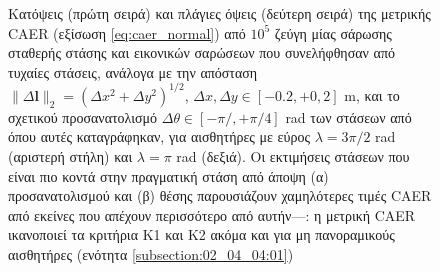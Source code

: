 \begin{figure}\centering
  
  \vspace{1cm}
  \caption{\small Κατόψεις (πρώτη σειρά) και πλάγιες όψεις
           (δεύτερη σειρά) της μετρικής CAER (εξίσωση \ref{eq:caer_normal}) από
           $10^5$ ζεύγη μίας σάρωσης σταθερής στάσης και εικονικών σαρώσεων που
           συνελήφθησαν από τυχαίες στάσεις, ανάλογα με την απόσταση $\|\Delta
           \bm{l}\|_2 = (\Delta x^2 + \Delta y^2)^{1/2}$, $\Delta x, \Delta y
           \in [-0.2, +0,2]$ m, και το σχετικού προσανατολισμό $\Delta \theta
           \in [-\pi/, +\pi/4]$ rad των στάσεων από όπου αυτές καταγράφηκαν,
           για αισθητήρες με εύρος $\lambda = 3\pi/2$ rad (αριστερή στήλη) και
           $\lambda = \pi$ rad (δεξιά). Οι εκτιμήσεις στάσεων που είναι πιο
           κοντά στην πραγματική στάση από άποψη (α) προσανατολισμού και (β)
           θέσης παρουσιάζουν χαμηλότερες τιμές CAER από εκείνες που απέχουν
           περισσότερο από αυτήν---: η μετρική CAER ικανοποιεί τα κριτήρια Κ1
           και Κ2 ακόμα και για μη πανοραμικούς
           αισθητήρες (ενότητα \ref{subsection:02_04_04:01})}
  \label{fig:03_02_01:caer}
\end{figure}

